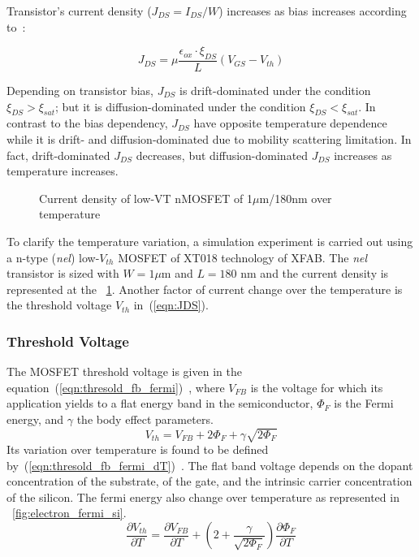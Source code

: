 Transistor's current density (\(J_{DS} = I_{DS}/W\)) increases as bias increases according to~\cite{Sze1981}:

\begin{equation}
J_{DS} = \mu \frac{\epsilon_{ox} \cdot \xi_{DS}}{L} \left(V_{GS}-V_{th}\right)
\label{eqn:JDS}
\end{equation}

Depending on transistor bias, \(J_{DS}\) is drift-dominated under the condition \(\xi_{DS} > \xi_{sat}\); but it is diffusion-dominated under the condition \(\xi_{DS} < \xi_{sat}\). In contrast to the bias dependency, \(J_{DS}\) have opposite temperature dependence while it is drift- and \allowbreak diffusion-dominated due to mobility scattering limitation. In fact, drift-dominated \(J_{DS}\) decreases, but diffusion-dominated \(J_{DS}\) increases as temperature increases.

\begin{figure}[!ht]
	\centering
	
	\caption{Current density of low-VT nMOSFET of 1\(\mu \)m/180nm over temperature}
	\label{fig:jds_nel}
\end{figure}

To clarify the temperature variation, a simulation experiment is carried out using a n-type (\emph{nel}) low-\(V_{th}\) MOSFET of XT018 technology of XFAB\@. The \emph{nel} transistor is sized with \(W = 1 \mu \)m and \(L=180\) nm and the current density is represented at the \figurename~\ref{fig:jds_nel}. Another factor of current change over the temperature is the threshold voltage \(V_{th} \) in~(\ref{eqn:JDS}).

\subsubsection{Threshold Voltage}      %
\label{sec:threshold}
The MOSFET threshold voltage is given in the equation~(\ref{eqn:thresold_fb_fermi})~\cite{Sze2006}, where \(V_{FB} \) is the voltage for which its application yields to a flat energy band in the semiconductor, \(\Phi_F \) is the Fermi energy, and \(\gamma \) the body effect parameters.
\begin{equation}
\label{eqn:thresold_fb_fermi}
V_{th} = V_{FB} + 2 \Phi_F + \gamma \sqrt{2 \Phi_F}
\end{equation}
Its variation over temperature is found to be defined by~(\ref{eqn:thresold_fb_fermi_dT})~\cite{Filanovsky2001}. The flat band voltage depends on the dopant concentration of the substrate, of the gate, and the intrinsic carrier concentration of the silicon. The fermi energy also change over temperature as represented in \figurename~\ref{fig:electron_fermi_si}.
\begin{equation}
\label{eqn:thresold_fb_fermi_dT}
\frac{\partial V_{th}}{\partial T} = \frac{\partial V_{FB}}{\partial T} + \left( 2  + \frac{\gamma}{\sqrt{2 \Phi_F}} \right) \frac{\partial \Phi_F}{\partial T}
\end{equation}

